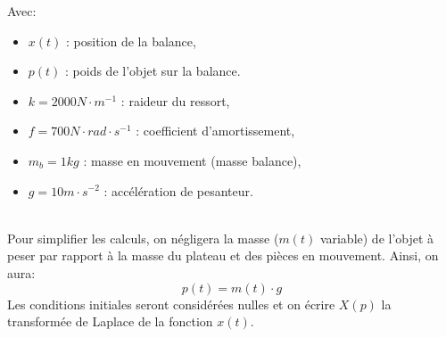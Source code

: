 \newpage

Avec:\\
\begin{minipage}{0.3\linewidth}
\begin{itemize}
 \item $x(t)$ : position de la balance,
 \item $p(t)$ : poids de l'objet sur la balance.
\end{itemize}
\end{minipage} \hfill
\begin{minipage}{0.65\linewidth}
\begin{itemize}
 \item $k=2000N\cdot m^{-1}$ : raideur du ressort,
 \item $f=700N\cdot rad\cdot s^{-1}$ : coefficient d'amortissement,
 \item $m_b=1kg$ : masse en mouvement (masse balance),
 \item $g=10m\cdot s^{-2}$ : accélération de pesanteur.
\end{itemize}
\end{minipage}

~\ \\

Pour simplifier les calculs, on négligera la masse ($m(t)$ variable) de l'objet à peser par rapport à la masse du plateau et des pièces en mouvement. Ainsi, on aura:
\begin{equation}
p(t)=m(t)\cdot g
\end{equation}
Les conditions initiales seront considérées nulles et on écrire $X(p)$ la transformée de Laplace de la fonction $x(t)$.







~\


